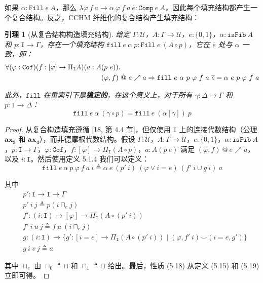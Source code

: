 \documentclass{ctexrep}
\theoremstyle{plain}
\newtheorem{lemma}[theorem]{引理}
\theoremstyle{definition}
\theoremstyle{remark}
\newcommand{\Cof}{\mathtt{Cof}}
\newcommand{\ax}[1]{\mathbf{ax_{#1}}}
\begin{document}
如果 $\alpha : \mathtt{Fill}\ e\ A$，那么 $\lambda\varphi\ f\ a \to \alpha\ \varphi\ f\ a\ \overline{e} : \mathtt{Comp}\ e\ A$，因此每个填充结构都产生一个复合结构。反之，CCHM 纤维化的复合结构产生填充结构：

\begin{lemma}[从复合结构构造填充结构]
给定 $\Gamma : \mathcal{U}$，$A : \Gamma \to \mathcal{U}$，$e : \{0, 1\}$，$\alpha : \mathtt{isFib}\ A$ 和 $p : \mathtt{I} \to \Gamma$，存在一个填充结构 $\mathtt{fill}\ e\ \alpha\ p : \mathtt{Fill}\ e\ (A \circ p)$，它在 $\overline{e}$ 处与 $\alpha$ 一致，即：
\begin{align}
\forall(\varphi : \Cof)(f : [\varphi] \to \Pi_\mathtt{I} A)(a : A&(p\ e)).\notag\\
&(\varphi, f) \ @\  e \nearrow a \Rightarrow \mathtt{fill}\ e\ \alpha\ p\ \varphi\ f\ a\ \overline{e} = \alpha\ e\ p\ \varphi\ f\ a
\end{align}

此外，$\mathtt{fill}$ 在重索引下是\textbf{稳定的}，在这个意义上，对于所有 $\gamma : \Delta \to \Gamma$ 和 $p : \mathtt{I} \to \Delta$：
\begin{equation}
\mathtt{fill}\ e\ \alpha\ (\gamma \circ p) = \mathtt{fill}\ e\ (\alpha[\gamma])\ p
\end{equation}
\end{lemma}

\begin{proof}
从复合构造填充遵循 [18, 第 4.4 节]，但仅使用 $\mathtt{I}$ 上的连接代数结构（公理 $\ax{3}$ 和 $\ax{4}$），而非德摩根代数结构。假设 $\Gamma : \mathcal{U}$，$A : \Gamma \to \mathcal{U}$，$e : \{0, 1\}$，$\alpha : \mathtt{isFib}\ A$，$p : \mathtt{I} \to \Gamma$，$\varphi : \Cof$，$f : [\varphi] \to \Pi_\mathtt{I}(A \circ p)$，$a : A(p\ e)$ 满足 $(\varphi, f) \ @\  e \nearrow a$，以及 $i : \mathtt{I}$。然后使用定义 5.1.4 我们可以定义：
\begin{equation}
\mathtt{fill}\ e\ \alpha\ p\ \varphi\ f\ a\ i \triangleq \alpha\ e\ (p'\ i)\ (\varphi \lor i = e)\ (f'\ i \cup g\ i)\ a
\end{equation}

其中
\begin{align*}
&p' : \mathtt{I} \to \mathtt{I} \to \Gamma \\
&p'\ i\ j \triangleq p(i \sqcap_e j) \\
&f' : (i : \mathtt{I}) \to [\varphi] \to \Pi_\mathtt{I}(A \circ (p'\ i)) \\
&f'\ i\ u\ j \triangleq f\ u\ (i \sqcap_e j) \\
&g : (i : \mathtt{I}) \to \{g' : [i = e] \to \Pi_\mathtt{I}(A \circ (p'\ i)) \mid (\varphi, f'\ i) \smallsmile  (i = e, g')\} \\
&g\ i\ v\ j \triangleq a
\end{align*}

其中 $\sqcap_e$ 由 $\sqcap_0 \triangleq \sqcap$ 和 $\sqcap_1 \triangleq \sqcup$ 给出。最后，性质 (5.18) 从定义 (5.15) 和 (5.19) 立即可得。
\end{proof}
\end{document}
